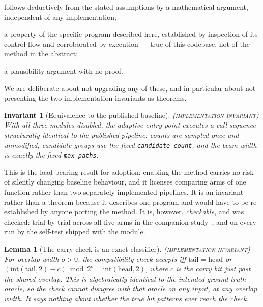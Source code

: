 \documentclass[final,5p,times,longtitle]{elsarticle}
\newcommand{\PROVEN}{\textsc{(proven)}}
\newcommand{\HEUR}{\textsc{(heuristic)}}
\newcommand{\INVAR}{\textsc{(implementation invariant)}}
\newtheorem{lemma}{Lemma}
\newtheorem{invariant}{Invariant}
\begin{document}
\begin{description}\itemsep1pt
\item[\PROVEN{}] follows deductively from the stated assumptions by a
mathematical argument, independent of any implementation;
\item[\INVAR{}] a property of the specific program described here,
established by inspection of its control flow and corroborated by
execution --- true of this codebase, not of the method in the abstract;
\item[\HEUR{}] a plausibility argument with no proof.
\end{description}

\noindent
We are deliberate about not upgrading any of these, and in particular
about not presenting the two implementation invariants as theorems.

\begin{invariant}[Equivalence to the published baseline]
\label{prop:baseline}
\INVAR{} With all three modules disabled, the adaptive entry point
executes a call sequence structurally identical to the published
pipeline: counts are sampled once and unmodified, candidate groups use
the fixed \texttt{candidate\_count}, and the beam width is exactly the
fixed \texttt{max\_paths}.
\end{invariant}

This is the load-bearing result for adoption: enabling the method carries
no risk of silently changing baseline behaviour, and it licenses
comparing arms of one function rather than two separately implemented
pipelines. It is an invariant rather than a theorem because it describes
one program and would have to be re-established by anyone porting the
method. It is, however, \emph{checkable}, and was checked: trial by trial across
all five arms in the companion study~\cite{companion}, and on every run
by the self-test shipped with the module.

\begin{lemma}[The carry check is an exact classifier]
\label{lem:carry}
\INVAR{} For overlap width $o>0$, the compatibility check accepts
\emph{iff} $\mathrm{tail}=\mathrm{head}$ or
$(\mathrm{int}(\mathrm{tail},2)-c)\bmod 2^{o}=\mathrm{int}(\mathrm{head},2)$,
where $c$ is the carry bit just past the shared overlap. This is
algebraically identical to the intended ground-truth oracle, so the check
cannot disagree with that oracle on \emph{any} input, at any overlap
width. It says nothing about whether the \emph{true} bit patterns ever
reach the check.
\end{lemma}
\end{document}
